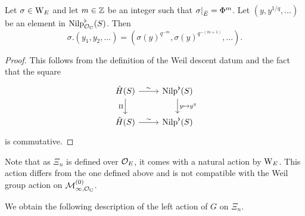 \documentclass[../main.tex]{subfiles}
\begin{document}
\begin{lem}\label{lem:ExplicitWeilGroupActionOnTildeH}
  Let $\sigma \in \mathrm W_E$ and let $m \in \mathbb{Z}$ be an integer such that
  $\sigma|_{\breve {E}} = \Phi^m$. Let $(y, y^{1/q}, \dots)$ be an element in
  ${\mathrm{Nilp}}_{\mathcal{O}_{\mathrm{C}}}^\flat(S)$.
  Then
  \begin{equation*}
    \sigma.(y_1, y_2, \dots) = (\sigma(y)^{q^{-m}}, \sigma(y)^{q^{-(m+1)}}, \dots).
  \end{equation*}
\begin{proof}
  This follows from the definition of the Weil descent datum and the fact that 
  the square
  \begin{equation*}
    \begin{tikzcd}[ampersand replacement=\&]
    	{\tilde H(S)} \& {\Nilp^\flat(S)} \\
    	{\tilde H(S)} \& {\Nilp^\flat(S)}
    	\arrow["\sim", from=1-1, to=1-2]
    	\arrow["\Pi"', from=1-1, to=2-1]
    	\arrow["{y \mapsto y^q}", from=1-2, to=2-2]
    	\arrow["\sim", from=2-1, to=2-2]
    \end{tikzcd}
  \end{equation*}
  is commutative.
\end{proof}
\end{lem}
\begin{rmk} 
  Note that  as $\Xi_n$ is defined over $\mathcal{O}_E$, it comes with a natural action
  by $\mathrm W_E$. This action differs from the one defined above and is not
  compatible with the Weil group action on $\mathcal{M}_{\infty, \mathcal{O}_{\mathrm{C}}}^{(0)}$.
\end{rmk}


We obtain the following description of the left action of $G$ on $\Xi_n$.
\end{document}
